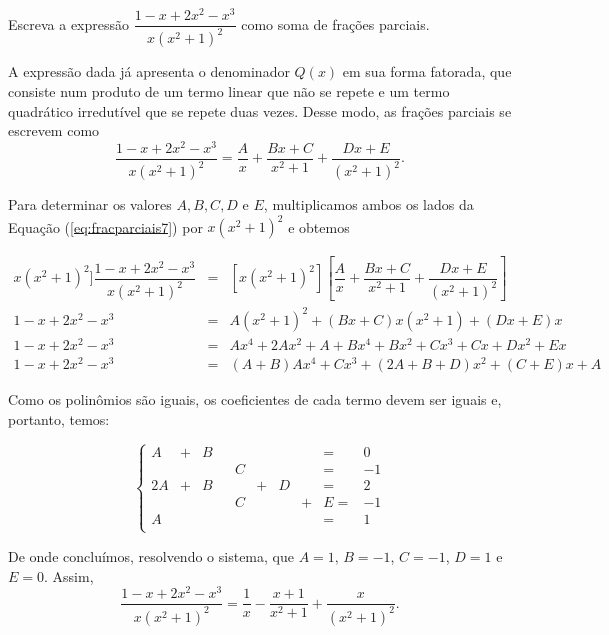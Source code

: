 \begin{exem}
    Escreva a expressão $\dfrac{1 - x + 2x^2 - x^3}{x(x^2 + 1)^2}$ como soma de frações parciais.

   A expressão dada já apresenta o denominador $Q(x)$ em sua forma fatorada, que consiste num produto de um termo linear que não se repete e um termo quadrático irredutível que se repete duas vezes. Desse modo, as frações parciais se escrevem como 
    \begin{equation}
    \label{eq:fracparciais7}
    \dfrac{1 - x + 2x^2 - x^3}{x(x^2 + 1)^2} = \dfrac{A}{x} + \dfrac{Bx + C}{x^2+1} + \dfrac{Dx + E}{(x^2+1)^2}.
    \end{equation}

    Para determinar os valores $A, B,C, D$ e $E$, multiplicamos ambos os lados da Equação (\ref{eq:fracparciais7}) por $x(x^2 + 1)^2$ e obtemos

    \begin{eqnarray*}
    x(x^2 + 1)^2]\dfrac{1 - x + 2x^2 - x^3}{x(x^2 + 1)^2} & = & [x(x^2 + 1)^2] \left[\dfrac{A}{x} + \dfrac{Bx + C}{x^2+1} + \dfrac{Dx + E}{(x^2+1)^2}\right]\\[5pt]
    1 - x + 2x^2 - x^3 & =& A(x^2 + 1)^2 + (Bx + C)x(x^2+1) + (Dx + E)x \\[5pt]
    1 - x + 2x^2 - x^3 & =& Ax^4 + 2Ax^2 + A + Bx^4 + Bx^2 + Cx^3 + Cx  + Dx^2 + Ex\\[5pt]
    1 - x + 2x^2 - x^3 & = & (A + B)Ax^4 + Cx^3 + (2A+B + D)x^2 + (C + E)x + A
    \end{eqnarray*}

    Como os polinômios são iguais, os coeficientes de cada termo devem ser iguais e, portanto, temos:

    \begin{equation*}
    \left\{ \begin{array}{ccccccccccc} 
    A & + & B &  &  & & & &=& 0 \\[5pt]
     &  &  & & C & &  & &=& -1\\[5pt]
    2A & + & B &  &  &+& D& &=& 2\\[5pt]
     &  &  & & C& &  &+ & E=& -1\\[5pt]
     A &  &  & & & &  & &=& 1\\[5pt]
    \end{array}
    \right.    
    \end{equation*}

    De onde concluímos, resolvendo o sistema, que $A = 1, \, B = -1$, $C = -1$, $D = 1$ e $E = 0$. Assim, $$\dfrac{1 - x + 2x^2 - x^3}{x(x^2 + 1)^2} = \dfrac{1}{x} - \dfrac{x + 1}{x^2+1} + \dfrac{x}{(x^2+1)^2}.$$
 \end{exem}

